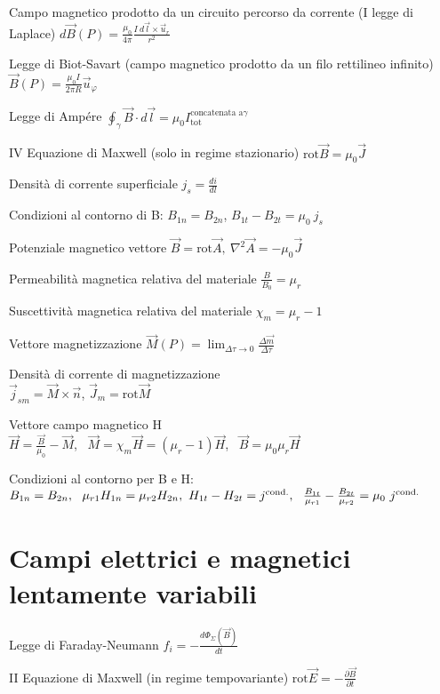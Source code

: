 \documentclass[8pt,a4paper]{article}
\numberwithin{equation}{subsection}
\begin{document}
\begin{multicols}{2}
Campo magnetico prodotto da un circuito percorso da corrente (I legge di Laplace) $d\vec{B} (P)=\frac{\mu _{0}}{4\pi }\frac{I\ d\vec{l} \times \vec{u}_{r}}{r^{2}}$

Legge di Biot-Savart (campo magnetico prodotto da un filo rettilineo infinito) $\vec{B} (P)=\frac{\mu _{0} I}{2\pi R}\vec{u}_{\varphi }$

Legge di Ampére $\oint _{\gamma }\vec{B} \cdot d\vec{l} =\mu _{0} I^{\text{concatenata a} \gamma }_{\text{tot}}$

IV Equazione di Maxwell (solo in regime stazionario) $\text{rot}\vec{B} =\mu _{0}\vec{J}$

Densità di corrente superficiale $j_{s} =\frac{di}{dl}$

Condizioni al contorno di B: $B_{1n} =B_{2n}$, $B_{1t} -B_{2t} =\mu _{0} \ j_{s}$

Potenziale magnetico vettore $\vec{B} =\text{rot}\vec{A} ,\ \nabla ^{2}\vec{A} =-\mu _{0}\vec{J}$

Permeabilità magnetica relativa del materiale $\frac{B}{B_{0}} =\mu _{r}$

Suscettività magnetica relativa del materiale $\chi _{m} =\mu _{r} -1$

Vettore magnetizzazione $\vec{M} (P)=\lim _{\Delta \tau \rightarrow 0}\frac{\Delta \vec{m}}{\Delta \tau }$

Densità di corrente di magnetizzazione \\$\vec{j}_{sm} =\vec{M} \times \vec{n}$, $\vec{J}_{m} =\text{rot}\vec{M}$

Vettore campo magnetico H \\$\vec{H} =\frac{\vec{B}}{\mu _{0}} -\vec{M}$, \ $\vec{M} =\chi _{m}\vec{H} =(\mu _{r} -1)\vec{H}$, \ $\vec{B} =\mu _{0} \mu _{r}\vec{H}$

Condizioni al contorno per B e H: \\$B_{1n} =B_{2n} ,\ \ \mu _{r1} H_{1n} =\mu _{r2} H_{2n} ,\\ \ H_{1t} -H_{2t} =j^{\text{cond.}} ,\ \ \frac{B_{1t}}{\mu _{r1}} -\frac{B_{2t}}{\mu _{r2}} =\mu _{0} \ j^{\text{cond.}}$
\section*{Campi elettrici e magnetici lentamente variabili}

Legge di Faraday-Neumann $f_{i} =-\frac{d\Phi _{\Sigma } (\vec{B} )}{dt}$

II Equazione di Maxwell (in regime tempovariante) $\text{rot}\vec{E} =-\frac{\partial \vec{B}}{\partial t}$


\end{multicols}
\end{document}
